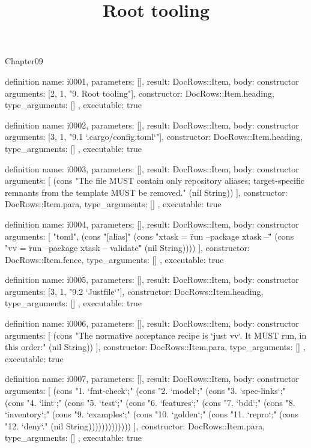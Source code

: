 \begin{lexlean}{Chapter09}
\title{Root tooling}
\begin{semanticmodule}
definition{
  name: i0001,
  parameters: [],
  result: DocRows::Item,
  body: constructor{
    arguments: [2, 1, "9. Root tooling"],
    constructor: DocRows::Item.heading,
    type_arguments: []
  },
  executable: true
}

definition{
  name: i0002,
  parameters: [],
  result: DocRows::Item,
  body: constructor{
    arguments: [3, 1, "9.1 `.cargo/config.toml`"],
    constructor: DocRows::Item.heading,
    type_arguments: []
  },
  executable: true
}

definition{
  name: i0003,
  parameters: [],
  result: DocRows::Item,
  body: constructor{
    arguments: [
      (cons "The file MUST contain only repository aliases; target-specific remnants from the template MUST be removed." (nil String))
    ],
    constructor: DocRows::Item.para,
    type_arguments: []
  },
  executable: true
}

definition{
  name: i0004,
  parameters: [],
  result: DocRows::Item,
  body: constructor{
    arguments: [
      "toml",
      (cons "[alias]" (cons "xtask = \"run --package xtask --\"" (cons "vv = \"run --package xtask -- validate\"" (nil String))))
    ],
    constructor: DocRows::Item.fence,
    type_arguments: []
  },
  executable: true
}

definition{
  name: i0005,
  parameters: [],
  result: DocRows::Item,
  body: constructor{
    arguments: [3, 1, "9.2 `Justfile`"],
    constructor: DocRows::Item.heading,
    type_arguments: []
  },
  executable: true
}

definition{
  name: i0006,
  parameters: [],
  result: DocRows::Item,
  body: constructor{
    arguments: [
      (cons "The normative acceptance recipe is `just vv`. It MUST run, in this order:" (nil String))
    ],
    constructor: DocRows::Item.para,
    type_arguments: []
  },
  executable: true
}

definition{
  name: i0007,
  parameters: [],
  result: DocRows::Item,
  body: constructor{
    arguments: [
      (cons "1. `fmt-check`;" (cons "2. `model`;" (cons "3. `spec-links`;" (cons "4. `lint`;" (cons "5. `test`;" (cons "6. `features`;" (cons "7. `bdd`;" (cons "8. `inventory`;" (cons "9. `examples`;" (cons "10. `golden`;" (cons "11. `repro`;" (cons "12. `deny`." (nil String)))))))))))))
    ],
    constructor: DocRows::Item.para,
    type_arguments: []
  },
  executable: true
}


\end{semanticmodule}
\end{lexlean}
